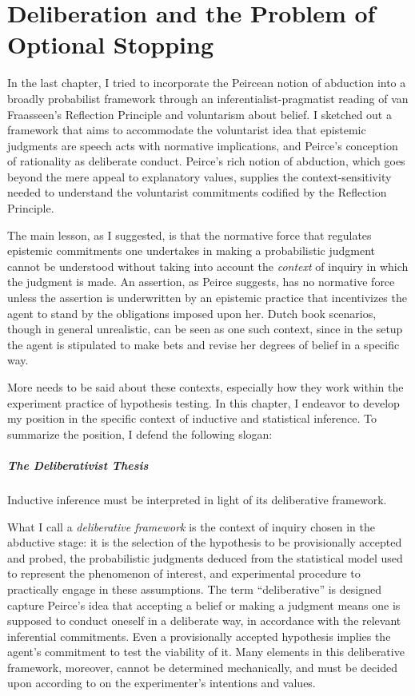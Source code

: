 
\hypertarget{deliberation-and-the-problem-of-optional-stopping}{%
\chapter{Deliberation and the Problem of Optional
Stopping}\label{ch:stopping}}

In the last chapter, I tried to incorporate the Peircean notion of
abduction into a broadly probabilist framework through an inferentialist-pragmatist reading of van
Fraasseen's Reflection Principle and voluntarism about belief. I sketched out a framework that aims to accommodate the
voluntarist idea that epistemic judgments are speech acts with normative
implications, and Peirce's conception of rationality as deliberate
conduct. Peirce's rich notion of abduction, which
goes beyond the mere appeal to explanatory values, supplies the context-sensitivity needed to understand the voluntarist commitments codified by the Reflection Principle.

The main lesson, as I suggested, is that the normative force that regulates
epistemic commitments one undertakes in making a probabilistic judgment cannot
be understood without taking into account the \emph{context} of inquiry in which the judgment is made. An
assertion, as Peirce suggests, has no normative force unless the
assertion is underwritten by an epistemic practice that incentivizes the
agent to stand by the obligations imposed upon her. Dutch book
scenarios, though in general unrealistic, can be seen as one such
context, since in the setup the agent is stipulated to make bets and
revise her degrees of belief in a specific way.

More needs to be said about these contexts, especially how they work within the experiment practice of hypothesis testing. In this chapter, I endeavor to develop my position in the specific
context of inductive and statistical inference. To summarize the position, I 
defend the following slogan:


\paragraph{The Deliberativist Thesis} Inductive inference must be interpreted in
light of its deliberative framework.


What I call a \emph{deliberative framework} is the context of inquiry chosen in the
abductive stage: it is the selection of the hypothesis to be provisionally
accepted and probed, the probabilistic judgments deduced from the
statistical model used to represent the phenomenon of interest, and
experimental procedure to practically engage in these assumptions. The
term ``deliberative'' is designed capture Peirce's idea that accepting a
belief or making a judgment means one is supposed to conduct oneself in
a deliberate way, in accordance with the relevant inferential commitments. Even a provisionally accepted hypothesis implies the agent's commitment to test the viability of it. Many elements in this deliberative framework, moreover, cannot be determined mechanically, and must be decided upon according to on the experimenter's intentions and values.

